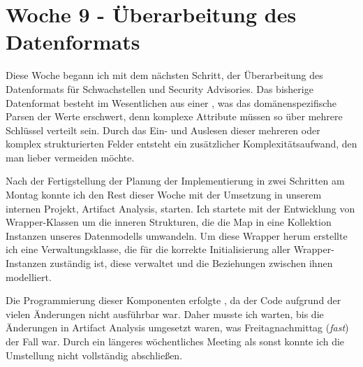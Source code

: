 \section{Woche 9 - Überarbeitung des Datenformats} \label{sec:bericht-wo-9}


\lweekdaymarginpar{\weekdayMondayLong}

Diese Woche begann ich mit dem nächsten Schritt, der Überarbeitung des Datenformats für Schwachstellen und Security Advisories.
Das bisherige Datenformat besteht im Wesentlichen aus einer , was das domänenspezifische Parsen der Werte erschwert, denn komplexe Attribute müssen so über mehrere Schlüssel verteilt sein.
Durch das Ein- und Auslesen dieser mehreren oder komplex strukturierten Felder entsteht ein zusätzlicher Komplexitätsaufwand, den man lieber vermeiden möchte.

\sweekdaymarginpar{\weekdayTuesdayShort, \weekdayThursdayShort, \weekdayFridayShort}

Nach der Fertigstellung der Planung der Implementierung in zwei Schritten am Montag konnte ich den Rest dieser Woche mit der Umsetzung in unserem internen Projekt, Artifact Analysis, starten.
Ich startete mit der Entwicklung von Wrapper-Klassen um die inneren  Strukturen, die die Map in eine Kollektion Instanzen unseres Datenmodells umwandeln.
Um diese Wrapper herum erstellte ich eine Verwaltungsklasse, die für die korrekte Initialisierung aller Wrapper-Instanzen zuständig ist, diese verwaltet und die Beziehungen zwischen ihnen modelliert.

Die Programmierung dieser Komponenten erfolgte , da der Code aufgrund der vielen Änderungen nicht ausführbar war.
Daher musste ich warten, bis die Änderungen in Artifact Analysis umgesetzt waren, was Freitagnachmittag (\textit{fast}) der Fall war.
Durch ein längeres wöchentliches Meeting als sonst konnte ich die Umstellung nicht vollständig abschließen.
